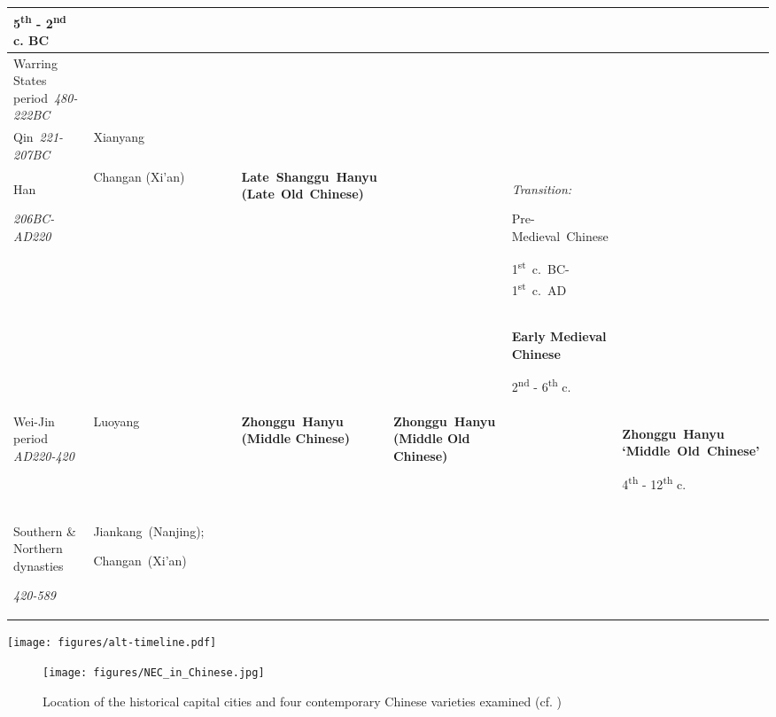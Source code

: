 \documentclass[output=paper,colorlinks,citecolor=brown,chinesefont]{langscibook}
\begin{document}
\begin{paperappendix}
\begin{sidewaystable}
\begin{tabularx}{\textwidth}{QQQ@{}Q@{}QQQ@{}Q}
5\textsuperscript{th} - 2\textsuperscript{nd} c. BC & \\
\midrule
Warring States \mbox{period {\itshape 480-222BC}}
&  &  &  &  &  &  & \\
\midrule
\mbox{Qin {\itshape 221-207BC}}
& Xianyang &  &  &  &  &  & \\
\midrule
Han

{\itshape 206BC-AD220}
& Changan (Xi’an) &  &  & \mbox{\bfseries Late Shanggu Hanyu} \mbox{\textbf{(Late} \textbf{Old} \textbf{Chinese)}}
&  & {\itshape Transition:}

\mbox{Pre-Medieval Chinese}

\mbox{1\textsuperscript{st} c. BC-1\textsuperscript{st} c. AD} & \\
\midrule
&  &  &  &  &  & {\bfseries Early Medieval Chinese}

2\textsuperscript{nd} - 6\textsuperscript{th} c. & \\
\midrule
Wei-Jin period
\textit{AD220-420}
& Luoyang &  &  & {\bfseries \mbox{Zhonggu Hanyu} (Middle Chinese)}  & {\bfseries \mbox{Zhonggu Hanyu} (Middle Old Chinese)}
&  & {\bfseries \mbox{Zhonggu Hanyu} \mbox{‘Middle Old Chinese’}}

4\textsuperscript{th} - 12\textsuperscript{th} c.\\
\midrule
Southern \& Northern dynasties

{\itshape 420-589}
& \mbox{Jiankang (Nanjing)};

\mbox{Changan (Xi’an)} &  &  &  &  &  & \\
\midrule
\end{tabularx}
\end{sidewaystable}


\begin{sidewaystable}


\texttt{[image: figures/alt-timeline.pdf]}


\nocite{Karlgren1915}
\nocite{Norman1988}
\nocite{Pan1982}
\nocite{Ohta1988}
\nocite{Peyraube1988,Peyraube1996}
\nocite{Wang1958}

\end{sidewaystable}

\begin{sidewaysfigure}
	\caption{Location of the historical capital cities and four contemporary Chinese varieties
	examined (cf. \citealt{Zhou1995, Wan1958})}
	\label{fig:lamA2}
	\texttt{[image: figures/NEC\_in\_Chinese.jpg]}
\end{sidewaysfigure}


\end{paperappendix}
\end{document}
